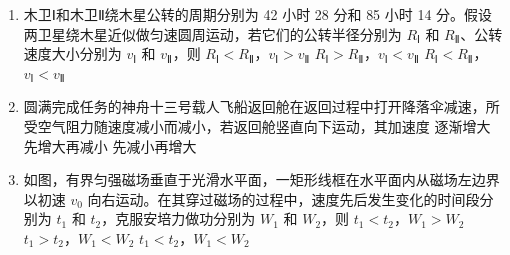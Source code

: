 \documentclass[\gkver]{gaokaozhenti}
\begin{document}
\begin{enumerate}
{由玻意耳定律：$p_{1}V_{1}=p_{2}V_{2}$，$l_{2}=20 \Ucm$。

正确选项为 A。
}

\item
木卫Ⅰ和木卫Ⅱ绕木星公转的周期分别为 42 小时 28 分和 85 小时 14 分。假设两卫星绕木星近似做匀速圆周运动，若它们的公转半径分别为 $R_{\text{Ⅰ}}$ 和 $R_{\text{Ⅱ}}$、公转速度大小分别为 $v_{\text{Ⅰ}}$ 和 $v_{\text{Ⅱ}}$，则
{$R_{\text{Ⅰ}} < R_{\text{Ⅱ}}$，$v_{\text{Ⅰ}} > v_{\text{Ⅱ}}$}
{$R_{\text{Ⅰ}} > R_{\text{Ⅱ}}$，$v_{\text{Ⅰ}} < v_{\text{Ⅱ}}$}
{$R_{\text{Ⅰ}} < R_{\text{Ⅱ}}$，$v_{\text{Ⅰ}} < v_{\text{Ⅱ}}$}

\item
圆满完成任务的神舟十三号载人飞船返回舱在返回过程中打开降落伞减速，所受空气阻力随速度减小而减小，若返回舱竖直向下运动，其加速度
{逐渐增大}
{先增大再减小}
{先减小再增大}

\item
如图，有界匀强磁场垂直于光滑水平面，一矩形线框在水平面内从磁场左边界以初速 $v_{0}$ 向右运动。在其穿过磁场的过程中，速度先后发生变化的时间段分别为 $t_{1}$ 和 $t_{2}$，克服安培力做功分别为 $W_{1}$ 和 $W_{2}$，则
\onepicture[w=5.50cm]{}
{$t_{1} < t_{2}$，$W_{1} > W_{2}$}
{$t_{1} > t_{2}$，$W_{1} < W_{2}$}
{$t_{1} < t_{2}$，$W_{1} < W_{2}$}
\end{enumerate}
\end{document}
